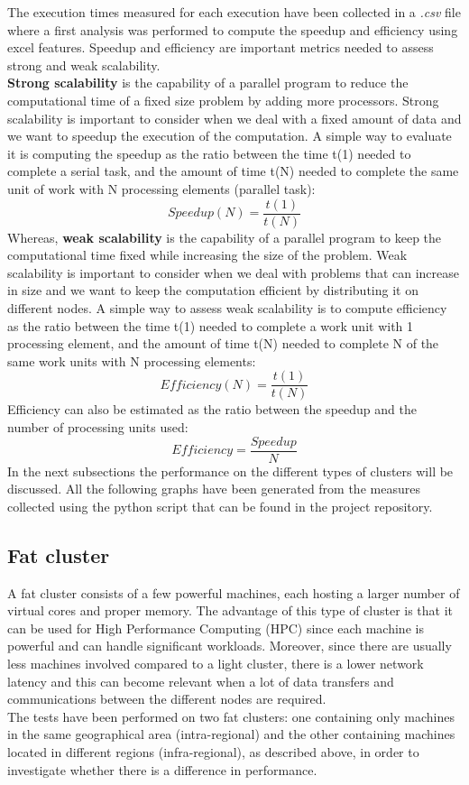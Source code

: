 \documentclass[final,5p,times,twocolumn,authoryear]{elsarticle}
\begin{document}
The execution times measured for each execution have been collected in a \emph{.csv} file where a first analysis was performed to compute the speedup and efficiency using excel features. Speedup and efficiency are important metrics needed to assess strong and weak scalability. \\
\textbf{Strong scalability} is the capability of a parallel program to reduce the computational time of a fixed size problem by adding more processors. Strong scalability is important to consider when we deal with a fixed amount of data and we want to speedup the execution of the computation. A simple way to evaluate it is computing the speedup as the ratio between the time t(1) needed to complete a serial task, and the amount of time t(N) needed to complete the same unit of work with N processing elements (parallel task)\cite{hpc scaling}:
$$ Speedup(N) = \frac{t(1)}{t(N)} $$
Whereas, \textbf{weak scalability} is the capability of a parallel program to keep the computational time fixed while increasing the size of the problem. Weak scalability is important to consider when we deal with problems that can increase in size and we want to keep the computation efficient by distributing it on different nodes. A simple way to assess weak scalability is to compute efficiency as the ratio between the time t(1) needed to complete a work unit with 1 processing element, and the amount of time t(N) needed to complete N of the same work units with N processing elements\cite{hpc scaling}:
$$ Efficiency(N) = \frac{t(1)}{t(N)} $$
Efficiency can also be estimated as the ratio between the speedup and the number of processing units used:
$$ Efficiency = \frac{Speedup}{N} $$
In the next subsections the performance on the different types of clusters will be discussed. All the following graphs have been generated from the measures collected using the python script that can be found in the project repository\cite{analysis me}.

\subsection{Fat cluster}
A fat cluster consists of a few powerful machines, each hosting a larger number of virtual cores and proper memory. The advantage of this type of cluster is that it can be used for High Performance Computing (HPC) since each machine is powerful and can handle significant workloads. Moreover, since there are usually less machines involved compared to a light cluster, there is a lower network latency and this can become relevant when a lot of data transfers and communications between the different nodes are required.\\
The tests have been performed on two fat clusters: one containing only machines in the same geographical area (intra-regional) and the other containing machines located in different regions (infra-regional), as described above, in order to investigate whether there is a difference in performance.
\end{document}
